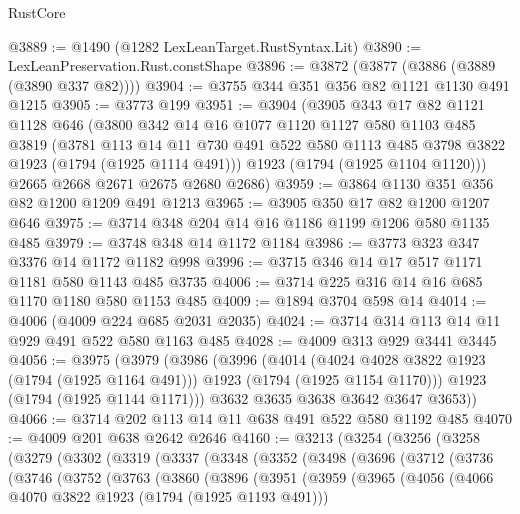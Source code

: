 \begin{lexlean}{RustCore}
\begin{coremodule}
@3889 := @1490 (@1282 LexLeanTarget.RustSyntax.Lit)
@3890 := LexLeanPreservation.Rust.constShape
@3896 := @3872 (@3877 (@3886 (@3889 (@3890 @337 @82))))
@3904 := @3755 @344 @351 @356 @82 @1121 @1130 @491 @1215
@3905 := @3773 @199
@3951 := @3904
    (@3905
      @343
      @17
      @82
      @1121
      @1128
      @646
      (@3800
        @342
        @14
        @16
        @1077
        @1120
        @1127
        @580
        @1103
        @485
        @3819
        (@3781
          @113
          @14
          @11
          @730
          @491
          @522
          @580
          @1113
          @485
          @3798
          @3822
          @1923
          (@1794 (@1925 @1114 @491)))
        @1923
        (@1794 (@1925 @1104 @1120)))
      @2665
      @2668
      @2671
      @2675
      @2680
      @2686)
@3959 := @3864 @1130 @351 @356 @82 @1200 @1209 @491 @1213
@3965 := @3905 @350 @17 @82 @1200 @1207 @646
@3975 := @3714 @348 @204 @14 @16 @1186 @1199 @1206 @580 @1135 @485
@3979 := @3748 @348 @14 @1172 @1184
@3986 := @3773 @323 @347 @3376 @14 @1172 @1182 @998
@3996 := @3715 @346 @14 @17 @517 @1171 @1181 @580 @1143 @485 @3735
@4006 := @3714 @225 @316 @14 @16 @685 @1170 @1180 @580 @1153 @485
@4009 := @1894 @3704 @598 @14
@4014 := @4006 (@4009 @224 @685 @2031 @2035)
@4024 := @3714 @314 @113 @14 @11 @929 @491 @522 @580 @1163 @485
@4028 := @4009 @313 @929 @3441 @3445
@4056 := @3975
    (@3979
      (@3986
        (@3996
          (@4014
            (@4024 @4028 @3822 @1923 (@1794 (@1925 @1164 @491)))
            @1923
            (@1794 (@1925 @1154 @1170)))
          @1923
          (@1794 (@1925 @1144 @1171)))
        @3632
        @3635
        @3638
        @3642
        @3647
        @3653))
@4066 := @3714 @202 @113 @14 @11 @638 @491 @522 @580 @1192 @485
@4070 := @4009 @201 @638 @2642 @2646
@4160 := @3213
    (@3254
      (@3256
        (@3258
          (@3279
            (@3302
              (@3319
                (@3337
                  (@3348
                    (@3352
                      (@3498
                        (@3696
                          (@3712
                            (@3736
                              (@3746
                                (@3752
                                  (@3763
                                    (@3860
                                      (@3896
                                        (@3951
                                          (@3959
                                            (@3965
                                              (@4056
                                                (@4066 @4070 @3822 @1923 (@1794 (@1925 @1193 @491)))

\end{coremodule}
\end{lexlean}
